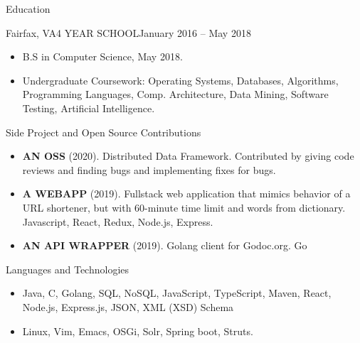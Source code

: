 \documentclass[]{mcdowellcv}
\begin{document}
	\begin{cvsection}{Education}
		\begin{cvsubsection}{Fairfax, VA}{4 YEAR SCHOOL}{January 2016 -- May 2018}
			\begin{itemize}
				\item B.S in Computer Science, May 2018.
				\item Undergraduate Coursework: Operating Systems, Databases, Algorithms, Programming Languages, Comp. Architecture, Data Mining, Software Testing, Artificial Intelligence.
			\end{itemize}
		\end{cvsubsection}
	\end{cvsection}
	
	\begin{cvsection}{Side Project and Open Source Contributions}
		\begin{cvsubsection}{}{}{}
			\begin{itemize}
        \item \textbf{AN OSS} (2020). Distributed Data Framework. Contributed by giving code reviews and finding bugs and implementing fixes for bugs.
				\item \textbf{A WEBAPP} (2019). Fullstack web application that mimics behavior of a URL shortener, but with 60-minute time limit and words from dictionary.  Javascript, React, Redux, Node.js, Express.
				\item \textbf{AN API WRAPPER} (2019). Golang client for Godoc.org.  Go
			\end{itemize}
		\end{cvsubsection}
	\end{cvsection}
	
	\begin{cvsection}{Languages and Technologies}
		\begin{cvsubsection}{}{}{}	
			\begin{itemize}
				\item Java, C, Golang, SQL, NoSQL, JavaScript, TypeScript, Maven, React, Node.js, Express.js, JSON, XML (XSD) Schema 
				\item Linux, Vim, Emacs, OSGi, Solr, Spring boot, Struts.
			\end{itemize}
		\end{cvsubsection}
	\end{cvsection}
	
\end{document}

